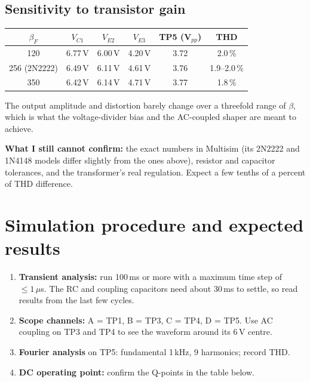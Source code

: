 \subsection{Sensitivity to transistor gain}
\begin{center}
\small
\begin{tabular}{@{}cccccc@{}}
\toprule
$\beta_F$ & $V_{C1}$ & $V_{E2}$ & $V_{E3}$ & TP5 (V$_{pp}$) & THD \\
\midrule
120 & 6.77\,V & 6.00\,V & 4.20\,V & 3.72 & 2.0\,\% \\
256 (2N2222) & 6.49\,V & 6.11\,V & 4.61\,V & 3.76 & 1.9--2.0\,\% \\
350 & 6.42\,V & 6.14\,V & 4.71\,V & 3.77 & 1.8\,\% \\
\bottomrule
\end{tabular}
\end{center}
The output amplitude and distortion barely change over a threefold range of $\beta$, which is what the voltage-divider bias and the AC-coupled shaper are meant to achieve.

\textbf{What I still cannot confirm:} the exact numbers in Multisim (its 2N2222 and 1N4148 models differ slightly from the ones above), resistor and capacitor tolerances, and the transformer's real regulation. Expect a few tenths of a percent of THD difference.

\section{Simulation procedure and expected results}
\label{sec:expected}
\begin{enumerate}
\item \textbf{Transient analysis:} run 100\,ms or more with a maximum time step of $\le1\,\mu$s. The RC and coupling capacitors need about 30\,ms to settle, so read results from the last few cycles.
\item \textbf{Scope channels:} A = TP1, B = TP3, C = TP4, D = TP5. Use AC coupling on TP3 and TP4 to see the waveform around its 6\,V centre.
\item \textbf{Fourier analysis} on TP5: fundamental 1\,kHz, 9 harmonics; record THD.
\item \textbf{DC operating point:} confirm the Q-points in the table below.
\end{enumerate}

